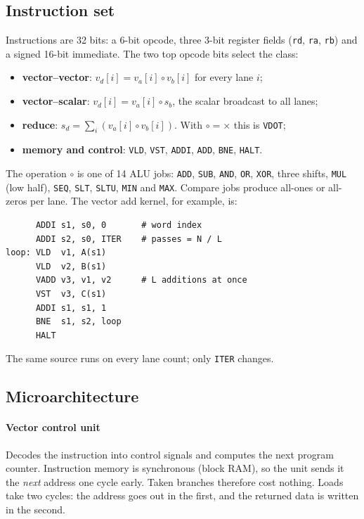 \documentclass[conference]{IEEEtran}
\begin{document}
\subsection{Instruction set}\label{sec:isa}
Instructions are 32 bits: a 6-bit opcode, three 3-bit register fields (\texttt{rd},
\texttt{ra}, \texttt{rb}) and a signed 16-bit immediate. The two top opcode bits
select the class:
\begin{itemize}
\item \textbf{vector--vector}: $v_d[i] = v_a[i] \circ v_b[i]$ for every lane $i$;
\item \textbf{vector--scalar}: $v_d[i] = v_a[i] \circ s_b$, the scalar broadcast to all lanes;
\item \textbf{reduce}: $s_d = \sum_i (v_a[i] \circ v_b[i])$. With $\circ = \times$ this is \texttt{VDOT};
\item \textbf{memory and control}: \texttt{VLD}, \texttt{VST}, \texttt{ADDI}, \texttt{ADD}, \texttt{BNE}, \texttt{HALT}.
\end{itemize}
The operation $\circ$ is one of 14 ALU jobs: \texttt{ADD}, \texttt{SUB},
\texttt{AND}, \texttt{OR}, \texttt{XOR}, three shifts, \texttt{MUL} (low half),
\texttt{SEQ}, \texttt{SLT}, \texttt{SLTU}, \texttt{MIN} and \texttt{MAX}. Compare
jobs produce all-ones or all-zeros per lane. The vector add kernel, for example, is:
\begin{lstlisting}
      ADDI s1, s0, 0       # word index
      ADDI s2, s0, ITER    # passes = N / L
loop: VLD  v1, A(s1)
      VLD  v2, B(s1)
      VADD v3, v1, v2      # L additions at once
      VST  v3, C(s1)
      ADDI s1, s1, 1
      BNE  s1, s2, loop
      HALT
\end{lstlisting}
The same source runs on every lane count; only \texttt{ITER} changes.

\subsection{Microarchitecture}
\paragraph{Vector control unit} Decodes the instruction into control signals and
computes the next program counter. Instruction memory is synchronous (block RAM),
so the unit sends it the \emph{next} address one cycle early. Taken branches
therefore cost nothing. Loads take two cycles: the address goes out in the first,
and the returned data is written in the second.
\end{document}
